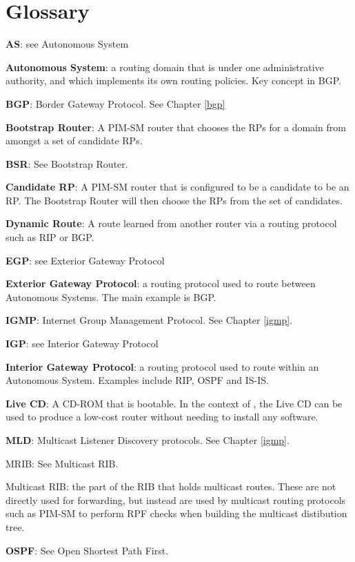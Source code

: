 \chapter*{Glossary}
\begin{description}
\item{\bf AS}: see Autonomous System
\item{\bf Autonomous System}: a routing domain that is under one
  administrative authority, and which implements its own routing
  policies.  Key concept in BGP.
\item{\bf BGP}: Border Gateway Protocol.  See Chapter \ref{bgp}
\item{\bf Bootstrap Router}: A PIM-SM router that chooses the RPs for
a domain from amongst a set of candidate RPs.
\item{\bf BSR}: See Bootstrap Router.
\item{\bf Candidate RP}: A PIM-SM router that is configured to be a
  candidate to be an RP.  The Bootstrap Router will then choose the
  RPs from the set of candidates.
\item{\bf Dynamic Route}: A route learned from another router via a
  routing protocol such as RIP or BGP.
\item{\bf EGP}: see Exterior Gateway Protocol
\item{\bf Exterior Gateway Protocol}: a routing protocol used to route
  between Autonomous Systems.  The main example is BGP.
\item{\bf IGMP}: Internet Group Management Protocol.  See Chapter \ref{igmp}.
\item{\bf IGP}: see Interior Gateway Protocol
\item{\bf Interior Gateway Protocol}: a routing protocol used to route
  within an Autonomous System.  Examples include RIP, OSPF and IS-IS.
\item{\bf Live CD}: A CD-ROM that is bootable.  In the context of
  \xorp, the Live CD can be used to produce a low-cost router without
  needing to install any software.
\item{\bf MLD}: Multicast Listener Discovery protocols.  See Chapter
  \ref{igmp}.
\item{MRIB}: See Multicast RIB.
\item{Multicast RIB}: the part of the RIB that holds multicast routes.
  These are not directly used for forwarding, but instead are used by
  multicast routing protocols such as PIM-SM to perform RPF checks
  when building the multicast distibution tree.
\item{\bf OSPF}: See Open Shortest Path First.

\end{description}
